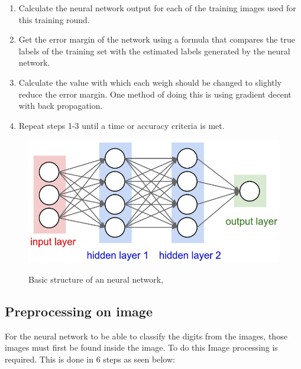 \begin{enumerate}
\item Calculate the neural network output for each of the training images used for this training round.
\item Get the error margin of the network using a formula that compares the true labels of the training set with the estimated labels generated by the neural network.
\item Calculate the value with which each weigh should be changed to slightly reduce the error margin. One method of doing this is using gradient decent with back propagation.
\item Repeat steps 1-3 until a time or accuracy criteria is met.
\end{enumerate}

\begin{figure}
  \centering
  \includegraphics[width=14cm]{NN}\\
  \caption{Basic structure of an neural network, \citet{karpathy2017}}%
  \label{fig:nn}
\end{figure}


\subsection{Preprocessing on image}
\label{sec:preprocess}

For the neural network to be able to classify the digits from the images, those images must first be found inside the image. To do this Image processing is required. This is done in 6 steps as seen below:

